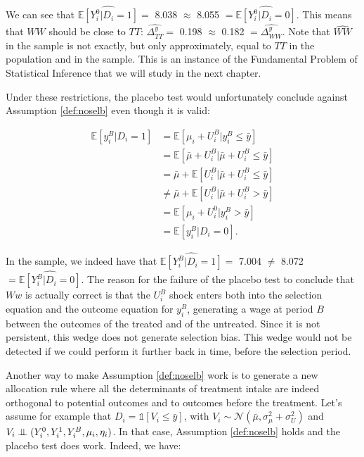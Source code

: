 \documentclass[
]{book}
\newcommand{\uns}[1]{\mathds{1}[ #1 ]}
\newcommand{\esp}[1]{\mathbb{E}[ #1 ]}
\newcommand\Ind{\protect\mathpalette{\protect\independenT}{\perp}}
\def\independenT#1#2{\mathrel{\setbox0\hbox{$#1#2$}\copy0\kern-\wd0\mkern4mu\box0}}
\theoremstyle{definition}
\theoremstyle{definition}
\theoremstyle{definition}
\theoremstyle{definition}
\theoremstyle{remark}
\begin{document}
We can see that \(\hat{\esp{Y_i^0|D_i=1}}=\) 8.038 \(\approx\) 8.055 \(=\hat{\esp{Y_i^0|D_i=0}}\).
This means that \(WW\) should be close to \(TT\): \(\hat{\Delta^y_{TT}}=\) 0.198 \(\approx\) 0.182 \(=\hat{\Delta^y_{WW}}\).
Note that \(\hat{WW}\) in the sample is not exactly, but only approximately, equal to \(TT\) in the population and in the sample.
This is an instance of the Fundamental Problem of Statistical Inference that we will study in the next chapter.

Under these restrictions, the placebo test would unfortunately conclude against Assumption \ref{def:noselb} even though it is valid:

\begin{align*}
\esp{y_i^B|D_i=1} & = \esp{\mu_i+ U_i^B|y_i^B\leq\bar{y}}\\
                  & = \esp{\bar{\mu}+U_i^B|\bar{\mu}+U_i^B\leq\bar{y}}\\
                  & = \bar{\mu}  + \esp{U_i^B|\bar{\mu}+U_i^B\leq\bar{y}}\\
                  & \neq \bar{\mu}  + \esp{U_i^B|\bar{\mu}+U_i^B>\bar{y}}\\
                  & = \esp{\mu_i+U_i^0|y_i^B>\bar{y}}\\
                  & = \esp{y_i^B|D_i=0}.                  
\end{align*}

In the sample, we indeed have that \(\hat{\esp{Y_i^B|D_i=1}}=\) 7.004 \(\neq\) 8.072 \(=\hat{\esp{Y_i^B|D_i=0}}\).
The reason for the failure of the placebo test to conclude that \(Ww\) is actually correct is that the \(U_i^B\) shock enters both into the selection equation and the outcome equation for \(y_i^B\), generating a wage at period \(B\) between the outcomes of the treated and of the untreated.
Since it is not persistent, this wedge does not generate selection bias.
This wedge would not be detected if we could perform it further back in time, before the selection period.

Another way to make Assumption \ref{def:noselb} work is to generate a new allocation rule where all the determinants of treatment intake are indeed orthogonal to potential outcomes and to outcomes before the treatment.
Let's assume for example that \(D_i=\uns{V_i\leq\bar{y}}\), with \(V_i\sim\mathcal{N}(\bar{\mu},\sigma^2_{\mu}+\sigma^2_{U})\) and \(V_i\Ind(Y_i^0,Y_i^1,Y_i^B,\mu_i,\eta_i)\).
In that case, Assumption \ref{def:noselb} holds and the placebo test does work.
Indeed, we have:
\end{document}
